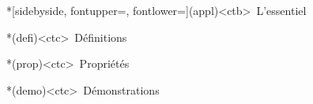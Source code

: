 \documentclass[../../main/main.tex]{subfiles}
\begin{document}
\vspace*{\fill}
\begin{tcn}*[sidebyside, fontupper=\small, fontlower=\small](appl)<ctb>{\iconchek~L'essentiel}
	\begin{tcn}*(defi)<ctc>{\icondefi~Définitions}
	\end{tcn}
	\begin{tcn}*(prop)<ctc>{\iconprop~Propriétés}
	\end{tcn}
	\begin{tcn}*(demo)<ctc>{\icondemo~Démonstrations}

\end{tcn}
\end{tcn}
\end{document}
